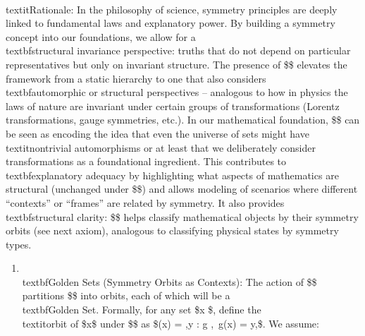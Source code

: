 \documentclass[11pt]{article}
\begin{document}
    \\textit{Rationale:} In the philosophy of science, symmetry principles are deeply linked to fundamental laws and explanatory power. By building a symmetry concept into our foundations, we allow for a \\textbf{structural invariance} perspective: truths that do not depend on particular representatives but only on invariant structure. The presence of \$\Sym\$ elevates the framework from a static hierarchy to one that also considers \\textbf{automorphic} or structural perspectives – analogous to how in physics the laws of nature are invariant under certain groups of transformations (Lorentz transformations, gauge symmetries, etc.). In our mathematical foundation, \$\Sym\$ can be seen as encoding the idea that even the universe of sets might have \\textit{nontrivial automorphisms} or at least that we deliberately consider transformations as a foundational ingredient. This contributes to \\textbf{explanatory adequacy} by highlighting what aspects of mathematics are structural (unchanged under \$\Sym\$) and allows modeling of scenarios where different “contexts” or “frames” are related by symmetry. It also provides \\textbf{structural clarity}: \$\Sym\$ helps classify mathematical objects by their symmetry orbits (see next axiom), analogous to classifying physical states by symmetry types.

\begin{enumerate}
  \item \\textbf{Golden Sets (Symmetry Orbits as Contexts):} The action of \$\Sym\$ partitions \$\infty\$ into orbits, each of which will be a \\textbf{Golden Set}. Formally, for any set \$x \in \infty\$, define the \\textit{orbit} of \$x\$ under \$\Sym\$ as \$\Orb(x) = {,y \in \infty : \exists g \in \Sym,\ g(x) = y,}\$. We assume:
\end{enumerate}
\end{document}
